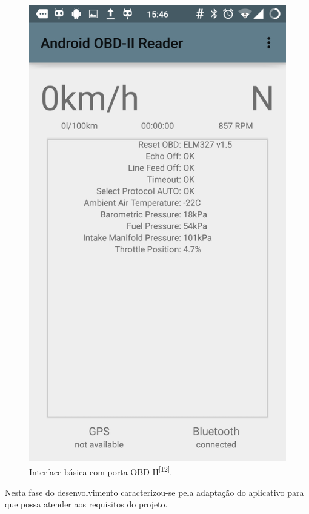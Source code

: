 \begin{figure}[hp]
    \centering
    
    \includegraphics[scale=0.3]{figures/git_obd_interface.png}
    
    \caption{Interface básica com porta OBD-II\textsuperscript{[12]}.}
    
    \label{fig:git_obd_interface}
\end{figure}

Nesta fase do desenvolvimento caracterizou-se pela adaptação do aplicativo para que possa atender aos requisitos do projeto.

